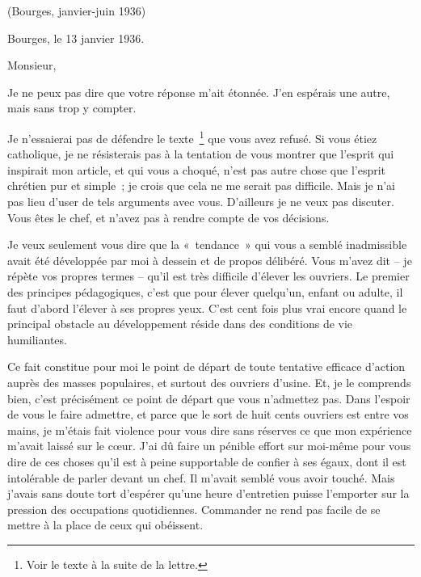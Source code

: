 \documentclass[french,twoside]{book} %
\begin{document}
\noindent \par
\noindent (Bourges, janvier-juin 1936)\par
\noindent Bourges, le 13 janvier 1936.\par
Monsieur,\par
Je ne peux pas dire que votre réponse m'ait étonnée. J'en espérais une autre, mais sans trop y compter.\par
Je n'essaierai pas de défendre le texte \footnote{Voir le texte à la suite de la lettre.} que vous avez refusé. Si vous étiez catholique, je ne résisterais pas à la tentation de vous montrer que l'esprit qui inspirait mon article, et qui vous a choqué, n'est pas autre chose que l'esprit chrétien pur et simple ; je crois que cela ne me serait pas difficile. Mais je n'ai pas lieu d'user de tels arguments avec vous. D'ailleurs je ne veux pas discuter. Vous êtes le chef, et n'avez pas à rendre compte de vos décisions.\par
Je veux seulement vous dire que la « tendance » qui vous a semblé inadmissible avait été développée par moi à dessein et de propos délibéré. Vous m'avez dit – je répète vos propres termes – qu'il est très difficile d'élever les ouvriers. Le premier des principes pédagogiques, c'est que pour élever quelqu'un, enfant ou adulte, il faut d'abord l'élever à ses propres yeux. C'est cent fois plus vrai encore quand le principal obstacle au développement réside dans des conditions de vie humiliantes.\par
Ce fait constitue pour moi le point de départ de toute tentative efficace d'action auprès des masses populaires, et surtout des ouvriers d'usine. Et, je le comprends bien, c'est précisément ce point de départ que vous n'admettez pas. Dans l'espoir de vous le faire admettre, et parce que le sort de huit cents ouvriers est entre vos mains, je m'étais fait violence pour vous dire sans réserves ce que mon expérience m'avait laissé sur le cœur. J'ai dû faire un pénible effort sur moi-même pour vous dire de ces choses qu'il est à peine supportable de confier à ses égaux, dont il est intolérable de parler devant un chef. Il m'avait semblé vous avoir touché. Mais j'avais sans doute tort d'espérer qu'une heure d'entretien puisse l'emporter sur la pression des occupations quotidiennes. Commander ne rend pas facile de se mettre à la place de ceux qui obéissent.\par
\end{document}

